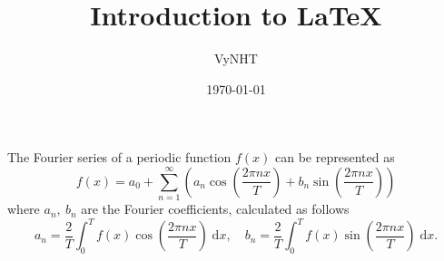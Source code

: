\documentclass[12pt,a4paper]{article}
\title{\textbf{Introduction to \LaTeX}}
\author{VyNHT}
\date{\today}
\begin{document}
	
	\maketitle 
	
	The Fourier series of a periodic function \(f(x)\) can be represented as
	\[f(x) = a_0 + \sum_{n=1}^{\infty} \left( a_n \cos\left(\frac{2\pi n x}{T}\right) + b_n \sin\left(\frac{2\pi n x}{T}\right) \right)\]
	where \(a_n,\ b_n\) are the Fourier coefficients, calculated as follows
	\[a_n = \frac{2}{T} \displaystyle\int_0^T f(x) \cos\left(\frac{2\pi n x}{T}\right)\; \mathrm{d}x,\quad b_n = \frac{2}{T} \displaystyle\int_0^T f(x) \sin\left(\frac{2\pi n x}{T}\right)\; \mathrm{d}x.\]
\end{document}
